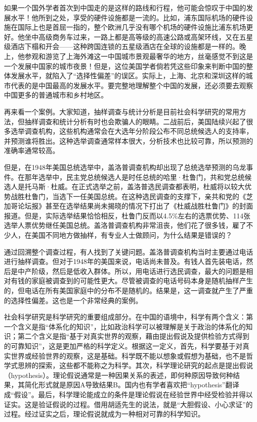 如果一个国外学者首次到中国走的是这样的路线和行程，他可能会惊叹于中国的发展水平！他所到之处，享受的硬件设施都是一流的。比如，浦东国际机场的硬件设施在国际上也是首屈一指的，整个欧洲几乎没有哪个机场的硬件设施比浦东机场更好。他坐中高级商务车过来，一路上都是高等级的高速公路或高架环线，又在五星级酒店下榻和开会——这种跨国连锁的五星级酒店在全球的设施都是一样的。晚上，他参观和游览了上海外滩这一中国城市景观最奢华的地方，丝毫感觉不到这是一个发展中国家的城市夜景！但是，这位美国学者倘若凭这些印象来判断中国的整体发展水平，就陷入了“选择性偏差”的误区。实际上，上海、北京和深圳这样的城市代表的是中国最高的发展水平。要完整地理解整个中国的发展，还必须要去观察中国更多的普通城市和乡村地区。

再来看一个案例。大家知道，抽样调查与统计分析是目前社会科学研究的常用方法，但抽样调查和统计分析有时也会欺骗人的眼睛。二战前后，美国陆续兴起了很多选举调查机构，这些机构通常会在大选年分阶段公布不同总统候选人的支持率，并预测谁将胜出。这种选举调查通常样本很大，分析技术也比较可靠，所以预测的准确率通常较高。

但是，在1948年美国总统选举中，盖洛普调查机构却出现了总统选举预测的乌龙事件。在那年选举中，民主党总统候选人是时任总统的哈里·杜鲁门，共和党总统候选人是托马斯·杜威。在正式选举之前，盖洛普选民调查都表明，杜威将以较大优势战胜杜鲁门，当选下一任美国总统。在这种选民调查的支撑下，亲共和党的《芝加哥论坛报》甚至在选举结果尚未揭晓的情况下打出了《杜威战胜杜鲁门》的封面报道。但是，实际选举结果恰恰相反，杜鲁门反而以4.5\%左右的选票优势、114张选举人票优势继任美国总统。盖洛普调查机构非常沮丧，他们花了很多钱，雇了不少人，在美国不同地方做抽样，有专业人士做顾问，为什么结果是错误的？

通过回溯整个调查过程，有人找到了关键问题。盖洛普调查机构当时主要通过电话进行抽样调查。但对于1948年的美国来说，电话尚未普及。有钱人首先装电话，然后是中产阶级，然后是低收入群体。所以，用电话进行选民调查，最大的问题是相对有钱的家庭被调查到的可能性更大。尽管被调查的电话号码本身是随机抽样产生的，但电话在所有美国家庭中的分布不是随机的。结果是，这一调查就产生了严重的选择性偏差。这也是一个非常经典的案例。


社会科学研究是科学研究的重要组成部分。在中国的语境中，科学有两个含义：第一个含义是指“体系化的知识”，比如政治科学可以被理解是关于政治的体系化的知识；第二个含义是指“基于对真实世界的观察，藉由提出假说及提供检验方式得到的可靠知识”，这是更加严格的科学定义。根据这一定义，首先，科学要基于对真实世界或经验世界的观察，这是基础。科学既不能以想象或假想为基础，也不是哲学式思辨的探索，这些都不能称之为科学。其次，科学理论研究的起点是提出假说（hypothesis）。理论假说通常是一种因果关系的表述，即何种原因导致何种结果，其简化形式就是原因A导致结果B。国内也有学者喜欢把“hypothesis”翻译成“假设”。最后，科学理论能成立的条件是理论假说在经验世界中经受检验并得以证实。这是验证假说的过程。借用胡适先生的说法，就是“大胆假设、小心求证”的过程。经过证实之后，理论假说就成为一种相对可靠的科学知识。

